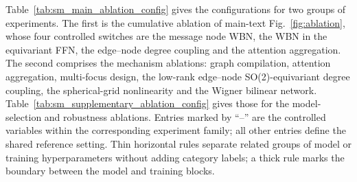 Table~\ref{tab:sm_main_ablation_config} gives the configurations for two groups of experiments.
The first is the cumulative ablation of main-text Fig.~\ref{fig:ablation}, whose four controlled switches are the message node WBN, the WBN in the equivariant FFN, the edge--node degree coupling and the attention aggregation.
The second comprises the mechanism ablations: graph compilation, attention aggregation, multi-focus design, the low-rank edge--node SO(2)-equivariant degree coupling, the spherical-grid nonlinearity and the Wigner bilinear network.
Table~\ref{tab:sm_supplementary_ablation_config} gives those for the model-selection and robustness ablations.
Entries marked by ``--'' are the controlled variables within the corresponding experiment family; all other entries define the shared reference setting.
Thin horizontal rules separate related groups of model or training hyperparameters without adding category labels; a thick rule marks the boundary between the model and training blocks.

